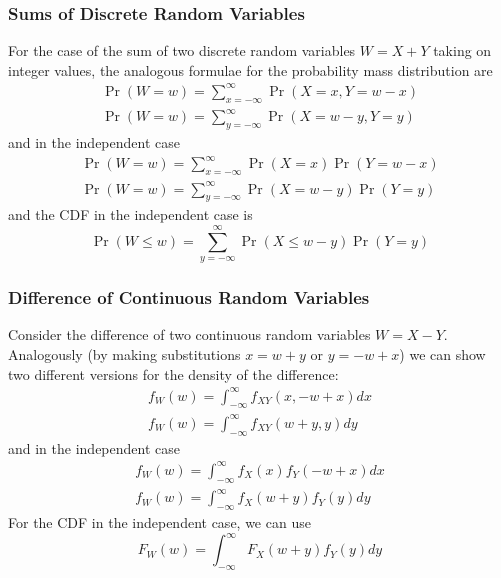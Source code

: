 \documentclass[11pt]{report} %
\begin{document}
\subsubsection{Sums of Discrete Random Variables}
For the case of the sum of two discrete random variables $W = X + Y$ taking on integer values, the analogous formulae for the probability mass distribution are
\begin{gather}
\operatorname{Pr}\left(W = w\right) = \sum_{x = -\infty}^{\infty}\operatorname{Pr}\left(X = x, Y = w - x\right) \\
\operatorname{Pr}\left(W = w\right) = \sum_{y = -\infty}^{\infty}\operatorname{Pr}\left(X = w - y, Y = y\right)
\end{gather}
and in the independent case
\begin{gather}
\operatorname{Pr}\left(W = w\right) = \sum_{x = -\infty}^{\infty}\operatorname{Pr}\left(X = x\right)\operatorname{Pr}\left(Y = w - x\right) \\
\operatorname{Pr}\left(W = w\right) = \sum_{y = -\infty}^{\infty}\operatorname{Pr}\left(X = w - y\right)\operatorname{Pr}\left(Y = y\right)
\end{gather}
and the CDF in the independent case is
\begin{equation}
\operatorname{Pr}\left(W \leq w\right) = \sum_{y = -\infty}^{\infty}\operatorname{Pr}\left(X \leq w - y\right)\operatorname{Pr}\left(Y = y\right)
\end{equation}

\subsubsection{Difference of Continuous Random Variables}

Consider the difference of two continuous random variables $W = X - Y$. Analogously (by making substitutions $x = w + y$ or $y = -w + x$) we can show two different versions for the density of the difference:
\begin{gather}
f_{W}\left(w\right) = \int_{-\infty}^{\infty}f_{XY}\left(x, -w + x\right)dx \\
f_{W}\left(w\right) = \int_{-\infty}^{\infty}f_{XY}\left(w + y, y\right)dy
\end{gather}
and in the independent case
\begin{gather}
f_{W}\left(w\right) = \int_{-\infty}^{\infty}f_{X}\left(x\right)f_{Y}\left(-w + x\right)dx \\
f_{W}\left(w\right) = \int_{-\infty}^{\infty}f_{X}\left(w + y\right)f_{Y}\left(y\right)dy
\end{gather}
For the CDF in the independent case, we can use
\begin{equation}
F_{W}\left(w\right) = \int_{-\infty}^{\infty}F_{X}\left(w + y\right)f_{Y}\left(y\right)dy
\end{equation}
\end{document}
